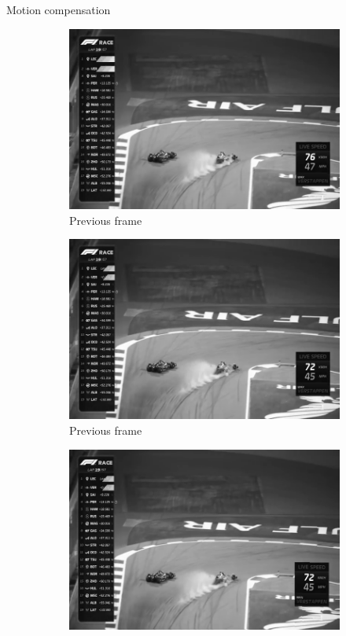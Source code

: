 \documentclass[aspectratio=1610,xcolor=dvipsnames]{beamer}
\begin{document}
\begin{frame}{Motion compensation}
    \begin{figure}[htbp]
        \begin{subfigure}[b]{0.3\textwidth}
            \centering
            \includegraphics[width=.9\textwidth]{images/race-previous.png}
            \caption{Previous frame}
            \label{fig:race-prev-frame}
        \end{subfigure}
        \hfill
        \begin{subfigure}[b]{0.3\textwidth}
            \includegraphics[width=.9\textwidth]{images/race-current.png}
            \caption{Previous frame}
            \label{fig:race-curr-frame}
        \end{subfigure}
        \hfill
        \begin{subfigure}[b]{0.3\textwidth}
            \includegraphics[width=.9\textwidth]{images/race-compensated.png}

\end{subfigure}
\end{figure}
\end{frame}
\end{document}
